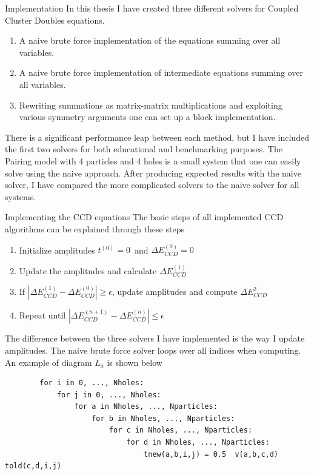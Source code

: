 \documentclass[twoside,english]{uiofysmaster}
\begin{document}
\begin{chapter}{Implementation}
	In this thesis I have created three different solvers for Coupled Cluster Doubles equations. 
	\begin{enumerate}
		\item A naive brute force implementation of the equations summing over all variables. 
		\item A naive brute force implementation of intermediate equations summing over all variables.
		\item Rewriting summations as matrix-matrix multiplications and exploiting various symmetry arguments one can set up a block implementation.
	\end{enumerate}	
	There is a significant performance leap between each method, but I have included the first two solvers for both educational and benchmarking purposes. The Pairing model with 4 particles and 4 holes is a small system that one can easily solve using the naive approach. After producing expected results with the naive solver, I have compared the more complicated solvers to the naive solver for all systems. 

	\begin{section}{Implementing the CCD equations}
		The basic steps of all implemented CCD algorithms can be explained through these steps
		\begin{enumerate}
			\item Initialize amplitudes $t^{(0)} = 0$ and $\Delta E_{CCD}^{(0)} = 0$
			\item Update the amplitudes and calculate $\Delta E_{CCD}^{(1)}$
			\item If $ |\Delta E_{CCD}^{(1)} - \Delta E_{CCD}^{(0)}| \geq \epsilon $, update amplitudes and compute $\Delta E_{CCD}^{2}$
			\item Repeat until $ |\Delta E_{CCD}^{(n+1)} - \Delta E_{CCD}^{(n)}| \leq \epsilon $
		\end{enumerate}
		The difference between the three solvers I have implemented is the way I update amplitudes. The naive brute force solver loops over all indices when computing. An example of diagram $L_a$ is shown below

		\begin{lstlisting}
		for i in 0, ..., Nholes:
			for j in 0, ..., Nholes:
				for a in Nholes, ..., Nparticles:
					for b in Nholes, ..., Nparticles:
						for c in Nholes, ..., Nparticles:
							for d in Nholes, ..., Nparticles:
								tnew(a,b,i,j) = 0.5  v(a,b,c,d)  told(c,d,i,j)
		\end{lstlisting}


\end{section}
\end{chapter}
\end{document}
